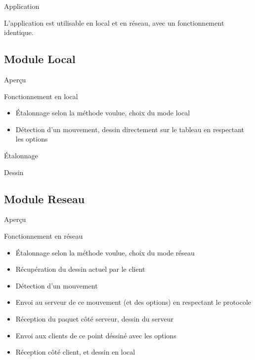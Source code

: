 \documentclass{beamer}
\begin{document}
		\begin{frame}{Application}
			
			L'application est utilisable en local et en réseau, avec un fonctionnement identique.
			
		\end{frame}
		
	\subsection{Module Local}
		\begin{frame}{Aperçu}
			\begin{block}{Fonctionnement en local}
				\begin{itemize}
				\item Étalonnage selon la méthode voulue, choix du mode local
				\item Détection d'un mouvement, dessin directement sur le tableau en respectant les options
				\end{itemize}
			\end{block}
		\end{frame}
		
		\begin{frame}{Étalonnage}
		\end{frame}
		\begin{frame}{Dessin}
		\end{frame}

	\subsection{Module Reseau}
		\begin{frame}{Aperçu}
		\begin{block}{Fonctionnement en réseau}
			\begin{itemize}
			\item Étalonnage selon la méthode voulue, choix du mode réseau
			\item Récupération du dessin actuel par le client
			\item Détection d'un mouvement
			\item Envoi au serveur de ce mouvement (et des options) en respectant le protocole
			\item Réception du paquet côté serveur, dessin du serveur
			\item Envoi aux clients de ce point déssiné avec les options
			\item Réception côté client, et dessin en local
			\end{itemize}
		\end{block}
		\end{frame}
		
\end{document}
